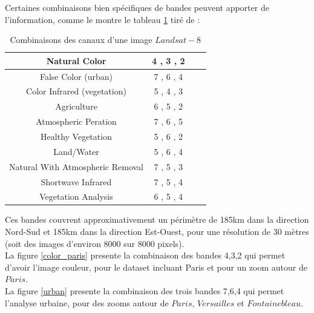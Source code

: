 \documentclass{book}
\begin{document}
\clearpage

Certaines combinaisons bien spécifiques de bandes peuvent apporter de l'information, comme le montre le tableau \ref{combinaison}
tiré de \cite{esri}:\\

\begin{table}
\begin{center}
\begin{tabular}{|c|c|c|c|}
\hline
Natural Color & 4 , 3 , 2\\
\hline
False Color (urban) & 7 , 6 , 4\\
\hline
Color Infrared (vegetation) & 5 , 4 , 3\\
\hline
Agriculture & 6 , 5 , 2\\
\hline
Atmospheric Peration & 7 , 6 , 5\\
\hline
Healthy Vegetation & 5 , 6 , 2\\
\hline
Land/Water & 5 , 6 , 4\\
\hline
Natural With Atmospheric Removal & 7 , 5 , 3\\
\hline
Shortwave Infrared & 7 , 5 , 4\\
\hline
Vegetation Analysis & 6 , 5 , 4\\
\hline
\end{tabular}
\end{center}
\caption{Combinaisons des canaux d'une image $Landsat-8$}
\label{combinaison}
\end{table}
\clearpage

Ces bandes couvrent approximativement un périmètre de 185km dans la direction Nord-Sud et 185km
dans la direction Est-Ouest, pour une résolution de 30 mètres (soit des images d'environ 8000 sur 8000 pixels).\\
La figure \ref{color_paris} presente la combinaison des bandes 4,3,2 qui permet d'avoir l'image couleur, pour le dataset incluant Paris et pour un zoom autour de $Paris$.\\
La figure \ref{urban} presente la combinaison des trois bandes 7,6,4 qui permet l'analyse urbaine, pour des zooms autour de $Paris$, $Versailles$ et $Fontainebleau$.\\
\end{document}
